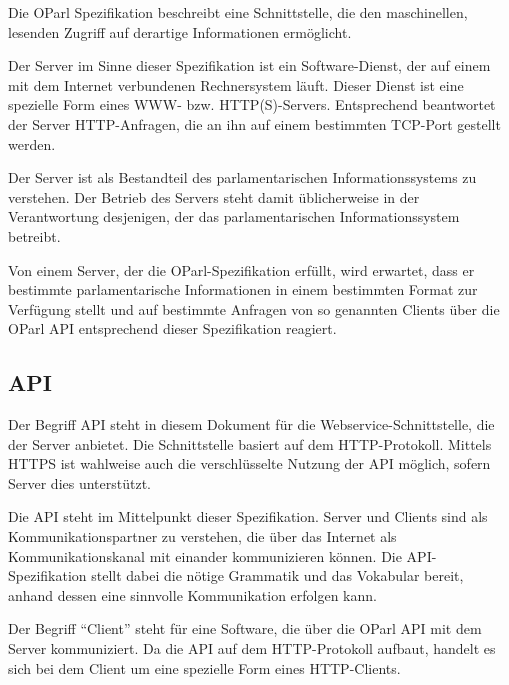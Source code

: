 \documentclass[,a4paper]{article}
\begin{document}
Die OParl Spezifikation beschreibt eine Schnittstelle, die den
maschinellen, lesenden Zugriff auf derartige Informationen ermöglicht.


Der Server im Sinne dieser Spezifikation ist ein Software-Dienst, der
auf einem mit dem Internet verbundenen Rechnersystem läuft. Dieser
Dienst ist eine spezielle Form eines WWW- bzw. HTTP(S)-Servers.
Entsprechend beantwortet der Server HTTP-Anfragen, die an ihn auf einem
bestimmten TCP-Port gestellt werden.

Der Server ist als Bestandteil des parlamentarischen Informationssystems
zu verstehen. Der Betrieb des Servers steht damit üblicherweise in der
Verantwortung desjenigen, der das parlamentarischen Informationssystem
betreibt.

Von einem Server, der die OParl-Spezifikation erfüllt, wird erwartet,
dass er bestimmte parlamentarische Informationen in einem bestimmten
Format zur Verfügung stellt und auf bestimmte Anfragen von so genannten
Clients über die OParl API entsprechend dieser Spezifikation reagiert.

\subsection{API}\label{api}

Der Begriff API steht in diesem Dokument für die
Webservice-Schnittstelle, die der Server anbietet. Die Schnittstelle
basiert auf dem HTTP-Protokoll. Mittels HTTPS ist wahlweise auch die
verschlüsselte Nutzung der API möglich, sofern Server dies unterstützt.

Die API steht im Mittelpunkt dieser Spezifikation. Server und Clients
sind als Kommunikationspartner zu verstehen, die über das Internet als
Kommunikationskanal mit einander kommunizieren können. Die
API-Spezifikation stellt dabei die nötige Grammatik und das Vokabular
bereit, anhand dessen eine sinnvolle Kommunikation erfolgen kann.


Der Begriff ``Client'' steht für eine Software, die über die OParl API
mit dem Server kommuniziert. Da die API auf dem HTTP-Protokoll aufbaut,
handelt es sich bei dem Client um eine spezielle Form eines
HTTP-Clients.
\end{document}
